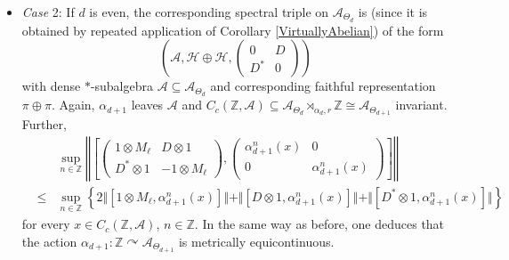 \documentclass[a4paper,11pt,reqno]{amsart}
\numberwithin{equation}{section}
\numberwithin{equation}{section}
\theoremstyle{definition}
\theoremstyle{remark}
\theoremstyle{remark}
\begin{document}
\begin{itemize}
\begin{eqnarray}
\end{eqnarray}
Since $\Theta$ was arbitrary, it follows from the induction assumption
that the restriction of the action $\alpha_{d+1}$ to $\mathcal{A}_{\Theta_{d}}$
is metrically equicontinuous and hence that the supremum in \eqref{eq:Supremum2}
is finite. We deduce the metric equicontinuity of the action $\alpha_{d+1}:\mathbb{Z}\curvearrowright\mathcal{A}_{\Theta_{d+1}}$.
\item \emph{Case }2: If $d$ is even, the corresponding spectral triple
on $\mathcal{A}_{\Theta_{d}}$ is (since it is obtained by repeated
application of Corollary \ref{VirtuallyAbelian}) of the form 
\[
\left(\mathcal{A},\mathcal{H}\oplus\mathcal{H},\left(\begin{array}{cc}
0 & D\\
D^{\ast} & 0
\end{array}\right)\right)
\]
with dense $\ast$-subalgebra $\mathcal{A}\subseteq\mathcal{A}_{\Theta_{d}}$
and corresponding faithful representation $\pi\oplus\pi$. Again,
$\alpha_{d+1}$ leaves $\mathcal{A}$ and $C_{c}(\mathbb{Z},\mathcal{A})\subseteq\mathcal{A}_{\Theta_{d}}\rtimes_{\alpha_{d},r}\mathbb{Z}\cong\mathcal{A}_{\Theta_{d+1}}$
invariant. Further,
\begin{eqnarray}
\nonumber
& & \sup_{n\in\mathbb{Z}}\left\Vert \left[\left(\begin{array}{cc}
1\otimes M_{\ell} & D\otimes1\\
D^{\ast}\otimes1 & -1\otimes M_{\ell}
\end{array}\right),\left(\begin{array}{cc}
\alpha_{d+1}^{n}(x) & 0\\
0 & \alpha_{d+1}^{n}(x)
\end{array}\right)\right]\right\Vert \\
\nonumber
&\leq& \sup_{n\in\mathbb{Z}}\left\{ 2\Vert[1\otimes M_{\ell},\alpha_{d+1}^{n}(x)]\Vert+\Vert[D\otimes1,\alpha_{d+1}^{n}(x)]\Vert+\Vert[D^{\ast}\otimes1,\alpha_{d+1}^{n}(x)]\Vert\right\}
\end{eqnarray}
 for every $x\in C_{c}(\mathbb{Z},\mathcal{A})$, $n\in\mathbb{Z}$.
In the same way as before, one deduces that the action $\alpha_{d+1}:\mathbb{Z}\curvearrowright\mathcal{A}_{\Theta_{d+1}}$
is metrically equicontinuous.
\end{itemize}

\vspace{3mm}

\end{document}

